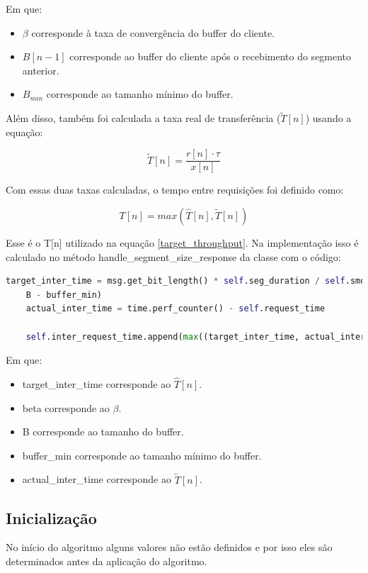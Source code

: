 \documentclass[10pt,twocolumn,letterpaper]{article}
\begin{document}
Em que:
\begin{itemize}
	\item $\beta$ corresponde à taxa de convergência do buffer do cliente.
	\item $B[n-1]$ corresponde ao buffer do cliente após o recebimento do segmento anterior.
	\item $B_{min}$ corresponde ao tamanho mínimo do buffer.
\end{itemize}

Além disso, também foi calculada a taxa real de transferência ($\tilde{T}[n]$) usando a equação:

\begin{equation}
	\tilde{T}[n] = \frac{r[n] \cdot \tau}{x[n]}
\end{equation}

Com essas duas taxas calculadas, o tempo entre requisições foi definido como:

\begin{equation}
	T[n] = max(\hat{T}[n], \tilde{T}[n])
\end{equation}

Esse é o T[n] utilizado na equação \ref{target_throughput}. Na implementação isso é calculado no método handle\_segment\_size\_response da classe com o código:

\begin{lstlisting}[language=python]
	target_inter_time = msg.get_bit_length() * self.seg_duration / self.smooth_throughputs[-1] + beta * (
	B - buffer_min)
	actual_inter_time = time.perf_counter() - self.request_time
	
	self.inter_request_time.append(max((target_inter_time, actual_inter_time))) 
\end{lstlisting}

Em que:

\begin{itemize}
	\item target\_inter\_time corresponde ao $\hat{T}[n]$.
	\item beta corresponde ao $\beta$.
	\item B corresponde ao tamanho do buffer.
	\item buffer\_min corresponde ao tamanho mínimo do buffer.
	\item actual\_inter\_time corresponde ao $\tilde{T}[n]$.
\end{itemize}

\subsection{Inicialização}
No início do algoritmo alguns valores não estão definidos e por isso eles são determinados antes da aplicação do algoritmo.
\end{document}

